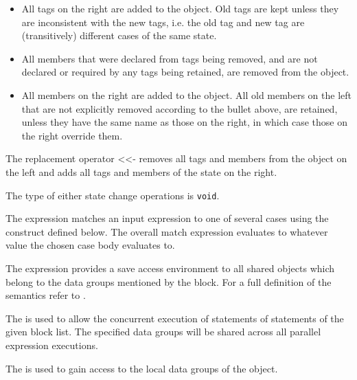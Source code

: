 \begin{itemize}

\item
All tags on the right are added to the object.  Old tags are kept
unless they are inconsistent with the new tags, i.e. the old tag and
new tag are (transitively) different cases of the same state.

\item
All members that were declared from tags being removed, and are not
declared or required by any tags being retained, are removed from
the object.

\item
All members on the right are added to the object.  All old members on
the left that are not explicitly removed according to the bullet
above, are retained, unless they have the same name as those on the
right, in which case those on the right override them. 

\end{itemize}

The replacement operator <<- removes all tags and members from the object on the left and adds all tags and members of the state on the right.   

The type of either state change operations is \texttt{void}.

The  expression matches an input expression to one of
several cases using the  construct defined below.
The overall match expression evaluates to whatever value the
chosen case body evaluates to.

The  expression provides a save access environment to all
shared objects which belong to the data groups mentioned by the
 block. For a full definition of the semantics refer to
\cite{stork09:concurrency_by_default, stork10:uaeminium_spec}.

The  is used to allow the concurrent execution of
statements of statements of the given block list. The specified data
groups will be shared across all parallel expression executions.

The  is used to gain access to the local data
groups of the object.

\begin{quote}


 {}  

 {} 


 {}





 {} 

\end{quote}

